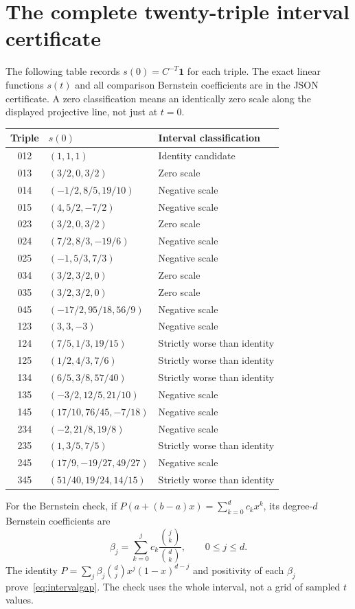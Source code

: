 \documentclass[11pt]{article}
\theoremstyle{definition}\newtheorem{definition}[theorem]{Definition}
\newcommand{\e}{\mathbf1}\newcommand{\cone}{\operatorname{cone}}
\begin{document}
\appendix
\section{The complete twenty-triple interval certificate}
\label{app:triples}
The following table records $s(0)=C^{-T}\e$ for each triple. The exact linear functions $s(t)$ and all comparison Bernstein coefficients are in the JSON certificate. A zero classification means an identically zero scale along the displayed projective line, not just at $t=0$.

\begin{center}\small
\begin{longtable}{cll}
\toprule
Triple & $s(0)$ & Interval classification\\
\midrule\endhead
012 & $(1,1,1)$ & Identity candidate\\
013 & $(3/2,0,3/2)$ & Zero scale\\
014 & $(-1/2,8/5,19/10)$ & Negative scale\\
015 & $(4,5/2,-7/2)$ & Negative scale\\
023 & $(3/2,0,3/2)$ & Zero scale\\
024 & $(7/2,8/3,-19/6)$ & Negative scale\\
025 & $(-1,5/3,7/3)$ & Negative scale\\
034 & $(3/2,3/2,0)$ & Zero scale\\
035 & $(3/2,3/2,0)$ & Zero scale\\
045 & $(-17/2,95/18,56/9)$ & Negative scale\\
123 & $(3,3,-3)$ & Negative scale\\
124 & $(7/5,1/3,19/15)$ & Strictly worse than identity\\
125 & $(1/2,4/3,7/6)$ & Strictly worse than identity\\
134 & $(6/5,3/8,57/40)$ & Strictly worse than identity\\
135 & $(-3/2,12/5,21/10)$ & Negative scale\\
145 & $(17/10,76/45,-7/18)$ & Negative scale\\
234 & $(-2,21/8,19/8)$ & Negative scale\\
235 & $(1,3/5,7/5)$ & Strictly worse than identity\\
245 & $(17/9,-19/27,49/27)$ & Negative scale\\
345 & $(51/40,19/24,14/15)$ & Strictly worse than identity\\
\bottomrule
\end{longtable}\end{center}
For the Bernstein check, if $P(a+(b-a)x)=\sum_{k=0}^d c_kx^k$, its degree-$d$ Bernstein coefficients are
\[
 \beta_j=\sum_{k=0}^j c_k\frac{\binom jk}{\binom dk},\qquad 0\le j\le d.
\]
The identity $P=\sum_j\beta_j\binom djx^j(1-x)^{d-j}$ and positivity of each $\beta_j$ prove~\eqref{eq:intervalgap}. The check uses the whole interval, not a grid of sampled $t$ values.
\end{document}
